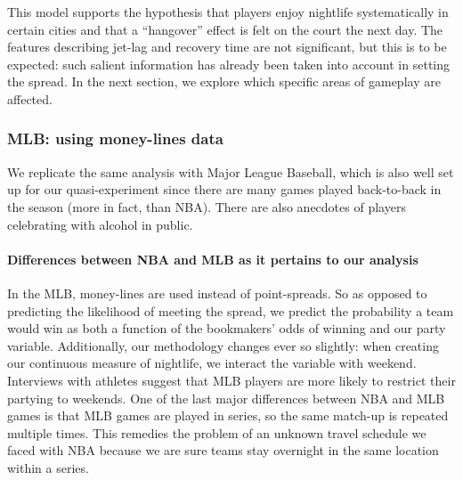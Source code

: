 \documentclass[letterpaper,12pt]{article}
\begin{document}
This model supports the hypothesis that players enjoy nightlife systematically in certain
cities and that a ``hangover'' effect is felt on the court the next day.
The features describing jet-lag and recovery time are not significant, but this is to be
expected: such salient information has already been taken into account in setting the spread.
In the next section, we explore which specific areas of gameplay are affected.


\subsubsection{MLB: using money-lines data}
We replicate the same analysis with
Major League Baseball, which is also well set up for our quasi-experiment since
there are many games played back-to-back in the season (more in fact, than NBA).
There are also anecdotes of players celebrating with alcohol in public.\citep{miller,campbell}

\paragraph{Differences between NBA and MLB as it pertains to our analysis}
In the MLB, money-lines
are used instead of point-spreads. So as opposed to predicting
the likelihood of meeting the spread, we predict the probability
a team would win as both a function of the bookmakers'
odds of winning and our party variable. 
Additionally, our methodology changes ever so slightly: when creating our
continuous measure of nightlife, we interact the variable with weekend. Interviews with athletes suggest that MLB players are more likely to
restrict their partying to weekends.
One of the last major differences between NBA and MLB games is that MLB games
are played in series, so the same match-up is repeated multiple times. This remedies
the problem of an unknown travel schedule we faced with NBA because we are sure 
teams stay overnight in the same location within a series.
\end{document}
